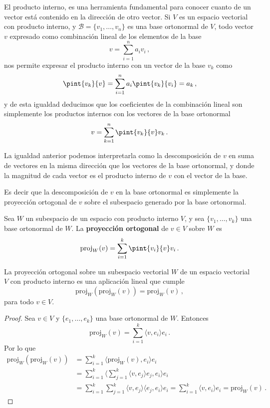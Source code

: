 El producto interno, es una herramienta fundamental para conocer cuanto de un vector está contenido en la dirección de otro vector.
Si $V$ es un espacio vectorial con producto interno, y $\mathcal{B}=\{v_1, \ldots, v_n\}$ es una base ortonormal de $V$, todo vector $v$ expresado como combinación lineal de los elementos de la base
\[
  v = \sum_{i=1}^n a_i v_i\,,
\]
nos permite expresar el producto interno con un vector de la base $v_k$ como
\[
  \pint{v_k}{v} = \sum_{i=1}^n a_i \pint{v_k}{v_i} = a_k\,,
\]
y de esta igualdad deducimos que los coeficientes de la combinación lineal son simplemente los productos internos con los vectores de la base ortonormal
\[
  v = \sum_{k=1}^n \pint{v_k}{v} v_k\,.
\]

La igualdad anterior podemos interpretarla como la descomposición de $v$ en suma de vectores en la misma dirección que los vectores de la base ortonormal, y donde la magnitud de cada vector es el producto interno de $v$ con el vector de la base.

Es decir que la descomposición de $v$ en la base ortonormal es simplemente la proyección ortogonal de $v$ sobre el subespacio generado por la base ortonormal.

\begin{defi}
  Sea $W$ un subespacio de un espacio con producto interno $V$, y sea $\{v_1, \ldots, v_k\}$ una base ortonormal de $W$. La \textbf{proyección ortogonal} de $v \in V$ sobre $W$ es
  $$\text{proj}_W(v) = \sum_{i=1}^k \pint{v_i}{v} v_i\,.$$
\end{defi}

\begin{prop}
  La proyección ortogonal sobre un subespacio vectorial $W$ de un espacio vectorial $V$ con producto interno es una aplicación lineal que cumple
  \[
    \text{proj}_W(\text{proj}_W(v)) = \text{proj}_W(v)\,,
  \]
  para todo $v\in V$.
\end{prop}
\begin{proof}
  Sea $v\in V$ y $\{e_1, \ldots, e_k\}$ una base ortonormal de $W$. Entonces
  \[
    \text{proj}_W(v) = \sum_{i=1}^k \langle v, e_i \rangle e_i\,.
  \]
  Por lo que
  \begin{align*}
    \text{proj}_W(\text{proj}_W(v)) & = \sum_{i=1}^k \langle \text{proj}_W(v), e_i \rangle e_i                                                                                        \\
                                    & = \sum_{i=1}^k \langle \sum_{j=1}^k \langle v, e_j \rangle e_j, e_i \rangle e_i                                                                 \\
                                    & = \sum_{i=1}^k \sum_{j=1}^k \langle v, e_j \rangle \langle e_j, e_i \rangle e_i = \sum_{i=1}^k \langle v, e_i \rangle e_i = \text{proj}_W(v)\,.
  \end{align*}
\end{proof}

